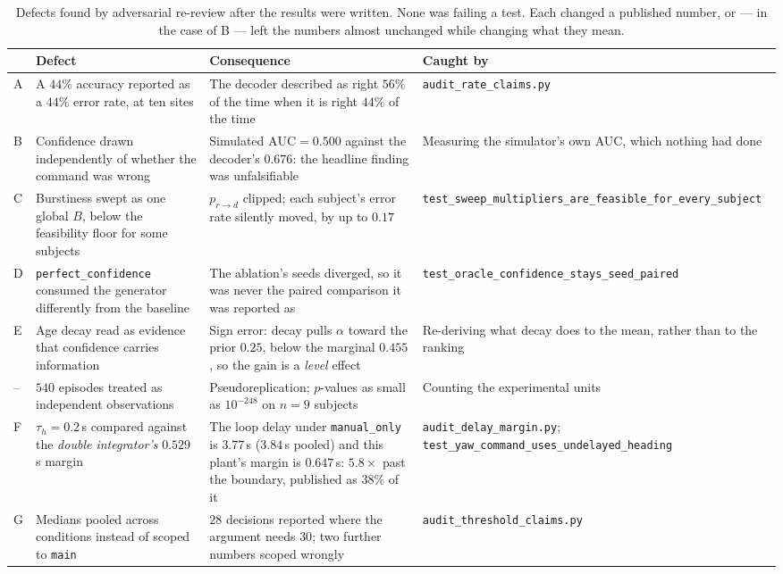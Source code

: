 \documentclass[11pt,a4paper]{article}
\newcommand{\vmanual}{\texttt{manual\_only}}
\theoremstyle{plain}
\theoremstyle{definition}
\begin{document}
\begin{table}[htbp]
\centering
\small
\begin{tabular}{@{}p{0.6cm}p{4.5cm}p{4.6cm}p{4.0cm}@{}}
\toprule
& Defect & Consequence & Caught by \\
\midrule
A & A $44\%$ accuracy reported as a $44\%$ error rate, at ten sites
  & The decoder described as right $56\%$ of the time when it is right
    $44\%$ of the time
  & \texttt{audit\_rate\_claims.py} \\
B & Confidence drawn independently of whether the command was wrong
  & Simulated $\mathrm{AUC} = 0.500$ against the decoder's $0.676$: the
    headline finding was unfalsifiable
  & Measuring the simulator's own AUC, which nothing had done \\
C & Burstiness swept as one global $B$, below the feasibility floor for
    some subjects
  & $p_{r \to d}$ clipped; each subject's error rate silently moved, by up
    to $0.17$
  & \texttt{test\_sweep\_}\allowbreak\texttt{multipliers\_}\allowbreak\texttt{are\_feasible\_}\allowbreak\texttt{for\_every\_subject} \\
D & \texttt{perfect\_confidence} consumed the generator differently from
    the baseline
  & The ablation's seeds diverged, so it was never the paired comparison
    it was reported as
  & \texttt{test\_oracle\_}\allowbreak\texttt{confidence\_}\allowbreak\texttt{stays\_seed\_paired} \\
E & Age decay read as evidence that confidence carries information
  & Sign error: decay pulls $\alpha$ toward the prior $0.25$, below the
    marginal $0.455$, so the gain is a \emph{level} effect
  & Re-deriving what decay does to the mean, rather than to the ranking \\
-- & $540$ episodes treated as independent observations
  & Pseudoreplication; $p$-values as small as $10^{-248}$ on $n = 9$
    subjects
  & Counting the experimental units \\
F & $\tau_h = 0.2$\,s compared against the \emph{double integrator's}
    $0.529$\,s margin
  & The loop delay under \vmanual{} is $3.77$\,s ($3.84$\,s pooled) and
    this plant's margin is $0.647$\,s: $5.8\times$ past the boundary,
    published as $38\%$ of it
  & \texttt{audit\_delay\_margin.py};
    \texttt{test\_yaw\_command\_}\allowbreak\texttt{uses\_}\allowbreak\texttt{undelayed\_heading} \\
G & Medians pooled across conditions instead of scoped to \texttt{main}
  & $28$ decisions reported where the argument needs $30$; two further
    numbers scoped wrongly
  & \texttt{audit\_threshold\_}\allowbreak\texttt{claims.py} \\
\bottomrule
\end{tabular}
\caption{Defects found by adversarial re-review after the results were
written. None was failing a test. Each changed a published number, or --- in
the case of B --- left the numbers almost unchanged while changing what they
mean.}
\label{tab:repair}
\end{table}
\end{document}
